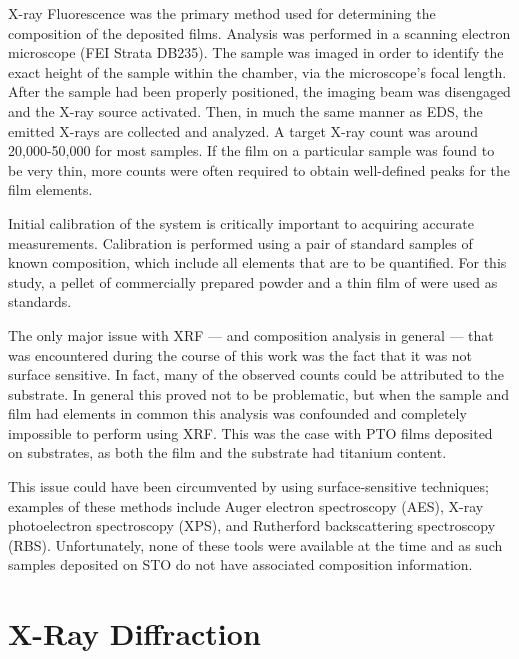 X-ray Fluorescence was the primary method used for determining the composition of the deposited films. Analysis was performed in a scanning electron microscope (FEI Strata DB235). The sample was imaged in order to identify the exact height of the sample within the chamber, via the microscope's focal length. After the sample had been properly positioned, the imaging beam was disengaged and the X-ray source activated. Then, in much the same manner as EDS, the emitted X-rays are collected and analyzed. A target X-ray count was around 20,000-50,000 for most samples. If the film on a particular sample was found to be very thin, more counts were often required to obtain well-defined peaks for the film elements. 

Initial calibration of the system is critically important to acquiring accurate measurements. Calibration is performed using a pair of standard samples of known composition, which include all elements that are to be quantified. For this study, a pellet of commercially prepared \PTO{} powder and a thin film of  were used as standards. 

The only major issue with XRF --- and composition analysis in general --- that was encountered during the course of this work was the fact that it was not surface sensitive. In fact, many of the observed counts could be attributed to the substrate. In general this proved not to be problematic, but when the sample and film had elements in common this analysis was confounded and completely impossible to perform using XRF. This was the case with PTO films deposited on  substrates, as both the film and the substrate had titanium content. 

This issue could have been circumvented by using surface-sensitive techniques; examples of these methods include Auger electron spectroscopy (AES), X-ray photoelectron spectroscopy (XPS), and Rutherford backscattering spectroscopy (RBS). Unfortunately, none of these tools were available at the time and as such samples deposited on STO do not have associated composition information. 


\section{X-Ray Diffraction}
\label{sec:Methods-XRD}

